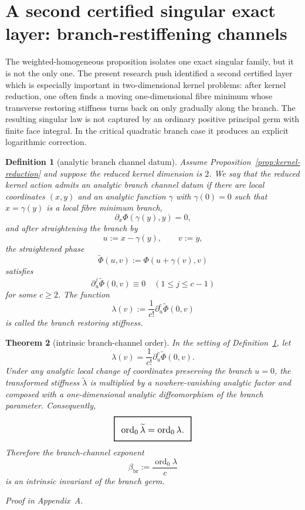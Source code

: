 \documentclass[11pt,a4paper]{article}
\numberwithin{equation}{section}
\newcommand{\geomboxed}[1]{%
  \setlength{\fboxsep}{8pt}%
  \setlength{\fboxrule}{0.9pt}%
  \fbox{\scalebox{1.12}{$\displaystyle #1$}}%
}
\theoremstyle{thmcompact}
\newtheorem{theorem}{Theorem}[section]
\newtheorem{definition}[theorem]{Definition}
\theoremstyle{remark}
\newcommand{\proofappendix}{\par{\hfill\scriptsize\emph{Proof in Appendix~A.}}\par}
\begin{document}
\section{A second certified singular exact layer: branch-restiffening channels}

The weighted-homogeneous proposition isolates one exact singular family, but it is not the only one. The present research push identified a second certified layer which is especially important in two-dimensional kernel problems: after kernel reduction, one often finds a moving one-dimensional fibre minimum whose transverse restoring stiffness turns back on only gradually along the branch. The resulting singular law is not captured by an ordinary positive principal germ with finite face integral. In the critical quadratic branch case it produces an explicit logarithmic correction.

\begin{definition}[analytic branch channel datum]\label{def:branch-channel}
Assume Proposition~\ref{prop:kernel-reduction} and suppose the reduced kernel dimension is $2$. We say that the reduced kernel action admits an \emph{analytic branch channel datum} if there are local coordinates $(x,y)$ and an analytic function $\gamma$ with $\gamma(0)=0$ such that $x=\gamma(y)$ is a local fibre minimum branch,
\[
\partial_x \Phi(\gamma(y),y)=0,
\]
and after straightening the branch by
\[
 u:=x-\gamma(y), \qquad v:=y,
\]
the straightened phase
\[
\widetilde \Phi(u,v):=\Phi(u+\gamma(v),v)
\]
satisfies
\[
\partial_u^j\widetilde \Phi(0,v)\equiv 0 \quad (1\le j\le c-1)
\]
for some $c\ge 2$. The function
\[
\lambda(v):=\frac{1}{c!}\partial_u^c\widetilde \Phi(0,v)
\]
is called the \emph{branch restoring stiffness}.
\end{definition}

\begin{theorem}[intrinsic branch-channel order]\label{thm:branch-invariant}
In the setting of Definition~\ref{def:branch-channel}, let
\[
\lambda(v)=\frac{1}{c!}\partial_u^c\widetilde \Phi(0,v).
\]
Under any analytic local change of coordinates preserving the branch $u=0$, the transformed stiffness $\widetilde \lambda$ is multiplied by a nowhere-vanishing analytic factor and composed with a one-dimensional analytic diffeomorphism of the branch parameter. Consequently,
\[
\geomboxed{\operatorname{ord}_0 \widetilde \lambda = \operatorname{ord}_0 \lambda.}
\]
Therefore the branch-channel exponent
\[
\beta_{\mathrm{br}}:=\frac{\operatorname{ord}_0\lambda}{c}
\]
is an intrinsic invariant of the branch germ.
\proofappendix
\end{theorem}
\end{document}

